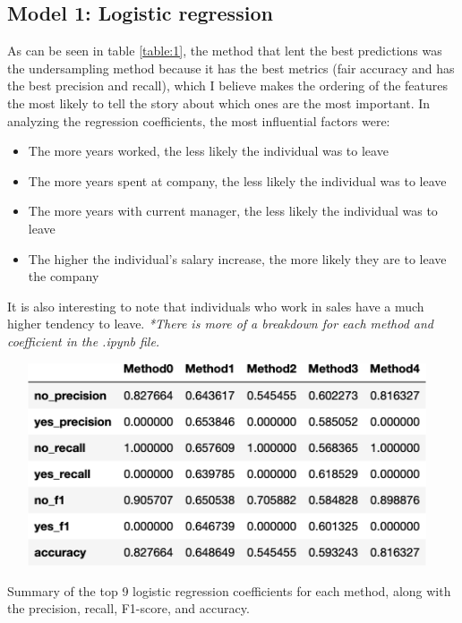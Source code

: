 \documentclass{article}
\begin{document}
\subsection{Model 1: Logistic regression}
\vspace{-2mm} 
As can be seen in table \ref{table:1}, the method that lent the best predictions was the undersampling method because it has the best metrics (fair accuracy and has the best precision and recall), which I believe makes the ordering of the features the most likely to tell the story about which ones are the most important. In analyzing the regression coefficients, the most influential factors were: 
\begin{itemize}[leftmargin=0.5cm]
\vspace{-2mm} 
\item The more years worked, the less likely the individual was to leave
\item The more years spent at company, the less likely the individual was to leave
\item The more years with current manager, the less likely the individual was to leave
\item The higher the individual's salary increase, the more likely they are to leave the company
\end{itemize}
It is also interesting to note that individuals who work in sales have a much higher tendency to leave. 
\textit{*There is more of a breakdown for each method and coefficient in the .ipynb file.}

\vspace{1mm} 
\begin{table}[ht]
\includegraphics[width=13cm, height=6cm]{regression_coefficient_comparison.png}

\caption{Summary of the top 9 logistic regression coefficients for each method, along with the precision, recall, F1-score, and accuracy.}
\label{table:1} 
\vspace{-4mm}%
\end{table}
\end{document}
